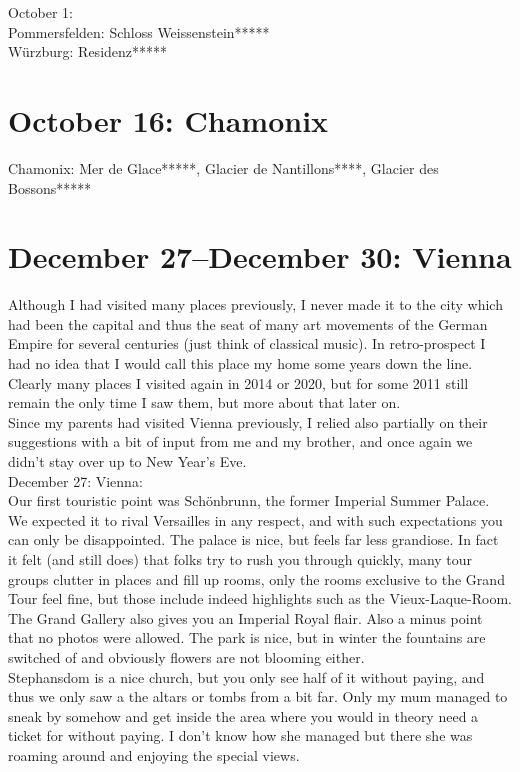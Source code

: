 October 1:\\
Pommersfelden: Schloss Weissenstein*****\\
W\"urzburg: Residenz*****

\section{October 16: Chamonix}
\label{Chamonix2011}

Chamonix: Mer de Glace*****, Glacier de Nantillons****, Glacier des Bossons*****

\section{December 27--December 30: Vienna}
\label{Vienna2011}

Although I had visited many places previously, I never made it to the city which had been the capital and thus the seat of many art movements of the German Empire for several centuries (just think of classical music). In retro-prospect I had no idea that I would call this place my home some years down the line. Clearly many places I visited again in 2014 or 2020, but for some 2011 still remain the only time I saw them, but more about that later on.\\

Since my parents had visited Vienna previously, I relied also partially on their suggestions with a bit of input from me and my brother, and once again we didn't stay over up to New Year's Eve.\\

December 27: Vienna: \\
Our first touristic point was Sch\"onbrunn, the former Imperial Summer Palace. We expected it to rival Versailles in any respect, and with such expectations you can only be disappointed. The palace is nice, but feels far less grandiose. In fact it felt (and still does) that folks try to rush you through quickly, many tour groups clutter in places and fill up rooms, only the rooms exclusive to the Grand Tour feel fine, but those include indeed highlights such as the Vieux-Laque-Room. The Grand Gallery also gives you an Imperial Royal flair. Also a minus point that no photos were allowed. The park is nice, but in winter the fountains are switched of and obviously flowers are not blooming either.\\
Stephansdom is a nice church, but you only see half of it without paying, and thus we only saw a the altars or tombs from a bit far. Only my mum managed to sneak by somehow and get inside the area where you would in theory need a ticket for without paying. I don't know how she managed but there she was roaming around and enjoying the special views.\\

